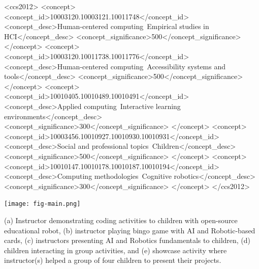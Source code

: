 \documentclass[sigconf]{acmart}
\begin{document}
\begin{CCSXML}
<ccs2012>
     <concept>
         <concept_id>10003120.10003121.10011748</concept_id>
         <concept_desc>Human-centered computing~Empirical studies in HCI</concept_desc>
         <concept_significance>500</concept_significance>
         </concept>
     <concept>
         <concept_id>10003120.10011738.10011776</concept_id>
         <concept_desc>Human-centered computing~Accessibility systems and tools</concept_desc>
         <concept_significance>500</concept_significance>
         </concept>
     <concept>
         <concept_id>10010405.10010489.10010491</concept_id>
         <concept_desc>Applied computing~Interactive learning environments</concept_desc>
         <concept_significance>300</concept_significance>
         </concept>
     <concept>
         <concept_id>10003456.10010927.10010930.10010931</concept_id>
         <concept_desc>Social and professional topics~Children</concept_desc>
         <concept_significance>500</concept_significance>
         </concept>
     <concept>
         <concept_id>10010147.10010178.10010187.10010194</concept_id>
         <concept_desc>Computing methodologies~Cognitive robotics</concept_desc>
         <concept_significance>300</concept_significance>
         </concept>
</ccs2012>
\end{CCSXML}



\begin{teaserfigure}
    \texttt{[image: fig-main.png]} %
    \caption{
    (a) Instructor demonstrating coding activities to children with open-source educational robot,
    (b) instructor playing  bingo game with AI and Robotic-based cards,
    (c) instructors presenting AI and Robotics fundamentals to children,
    (d) children interacting in group activities, and 
    (e) showcase activity where instructor(s) helped a group of four children to present their projects. 
    }
    \label{fig:main}
\end{teaserfigure}
\end{document}

